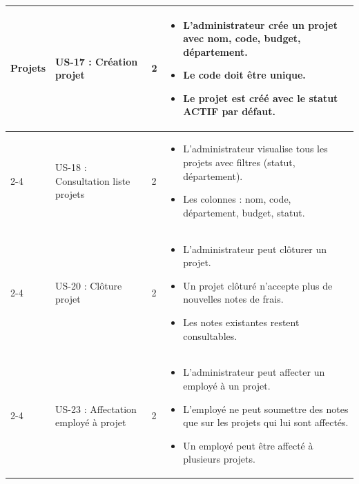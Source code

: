 \documentclass[12pt,a4paper]{report}
\begin{document}
\begin{longtable}{|p{2.5cm}|p{3cm}|p{1.5cm}|p{8cm}|}
\multirow{4}{*}{Projets} & US-17 : Création projet & 2 & \begin{itemize}
 \item L’administrateur crée un projet avec nom, code, budget, département.
 \item Le code doit être unique.
 \item Le projet est créé avec le statut ACTIF par défaut.
\end{itemize} \\
\cline{2-4}
& US-18 : Consultation liste projets & 2 & \begin{itemize}
 \item L’administrateur visualise tous les projets avec filtres (statut, département).
 \item Les colonnes : nom, code, département, budget, statut.
\end{itemize} \\
\cline{2-4}
& US-20 : Clôture projet & 2 & \begin{itemize}
 \item L’administrateur peut clôturer un projet.
 \item Un projet clôturé n’accepte plus de nouvelles notes de frais.
 \item Les notes existantes restent consultables.
\end{itemize} \\
\cline{2-4}
& US-23 : Affectation employé à projet & 2 & \begin{itemize}
 \item L’administrateur peut affecter un employé à un projet.
 \item L’employé ne peut soumettre des notes que sur les projets qui lui sont affectés.
 \item Un employé peut être affecté à plusieurs projets.
\end{itemize} \\
\hline


\end{longtable}
\end{document}
